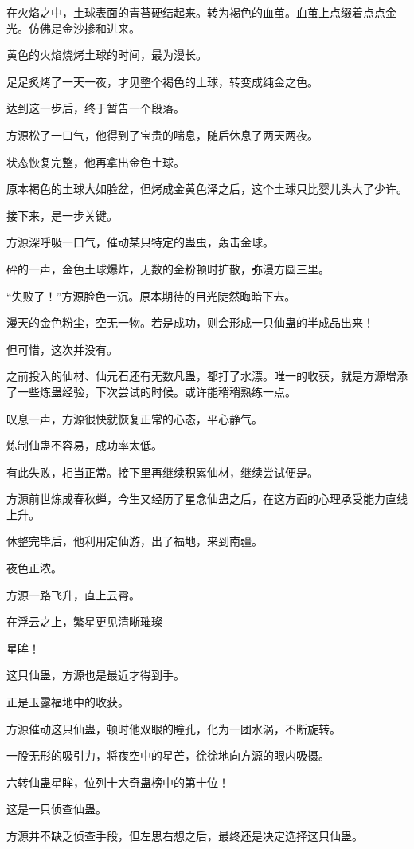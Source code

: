 \begin{this_body}
在火焰之中，土球表面的青苔硬结起来。转为褐色的血茧。血茧上点缀着点点金光。仿佛是金沙掺和进来。

黄色的火焰烧烤土球的时间，最为漫长。

足足炙烤了一天一夜，才见整个褐色的土球，转变成纯金之色。

达到这一步后，终于暂告一个段落。

方源松了一口气，他得到了宝贵的喘息，随后休息了两天两夜。

状态恢复完整，他再拿出金色土球。

原本褐色的土球大如脸盆，但烤成金黄色泽之后，这个土球只比婴儿头大了少许。

接下来，是一步关键。

方源深呼吸一口气，催动某只特定的蛊虫，轰击金球。

砰的一声，金色土球爆炸，无数的金粉顿时扩散，弥漫方圆三里。

“失败了！”方源脸色一沉。原本期待的目光陡然晦暗下去。

漫天的金色粉尘，空无一物。若是成功，则会形成一只仙蛊的半成品出来！

但可惜，这次并没有。

之前投入的仙材、仙元石还有无数凡蛊，都打了水漂。唯一的收获，就是方源增添了一些炼蛊经验，下次尝试的时候。或许能稍稍熟练一点。

叹息一声，方源很快就恢复正常的心态，平心静气。

炼制仙蛊不容易，成功率太低。

有此失败，相当正常。接下里再继续积累仙材，继续尝试便是。

方源前世炼成春秋蝉，今生又经历了星念仙蛊之后，在这方面的心理承受能力直线上升。

休整完毕后，他利用定仙游，出了福地，来到南疆。

夜色正浓。

方源一路飞升，直上云霄。

在浮云之上，繁星更见清晰璀璨

星眸！

这只仙蛊，方源也是最近才得到手。

正是玉露福地中的收获。

方源催动这只仙蛊，顿时他双眼的瞳孔，化为一团水涡，不断旋转。

一股无形的吸引力，将夜空中的星芒，徐徐地向方源的眼内吸摄。

六转仙蛊星眸，位列十大奇蛊榜中的第十位！

这是一只侦查仙蛊。

方源并不缺乏侦查手段，但左思右想之后，最终还是决定选择这只仙蛊。


\end{this_body}
